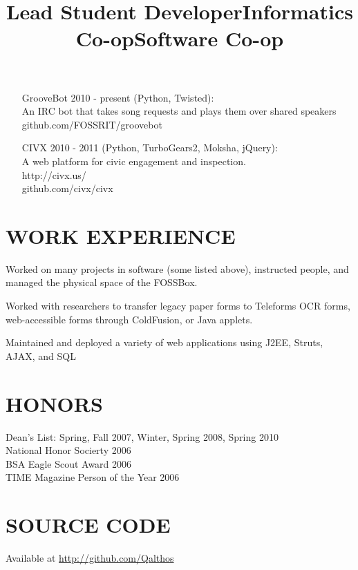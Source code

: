 \documentclass[line]{res}
\begin{document}
\begin{resume}
\begin{itemize}
        \item[GrooveBot]
            2010 - present (Python, Twisted):\\
            An IRC bot that takes song requests and plays them over shared speakers\\
            github.com/FOSSRIT/groovebot

        \item[CIVX]
            2010 - 2011 (Python, TurboGears2, Moksha, jQuery):\\
            A web platform for civic engagement and inspection.\\
            http://civx.us/\\
            github.com/civx/civx
    \end{itemize}

\section{WORK EXPERIENCE}
    \title{Lead Student Developer}
    \begin{position}
        Worked on many projects in software (some listed above), instructed
        people, and managed the physical space of the FOSSBox.
    \end{position}

    \title{Informatics Co-op}
    \begin{position}
        Worked with researchers to transfer legacy paper forms to Teleforms OCR
        forms, web-accessible forms through ColdFusion, or Java applets.
    \end{position}

    \title{Software Co-op}
    \begin{position}
        Maintained and deployed a variety of web applications using J2EE,
        Struts, AJAX, and SQL
    \end{position}

\section{HONORS}
    Dean's List: Spring, Fall 2007, Winter, Spring 2008, Spring 2010 \\
    National Honor Socierty 2006 \\
    BSA Eagle Scout Award 2006 \\
    TIME Magazine Person of the Year 2006 \\

\section{SOURCE CODE}
    Available at \url{http://github.com/Qalthos}\\

\end{resume}
\end{document}
